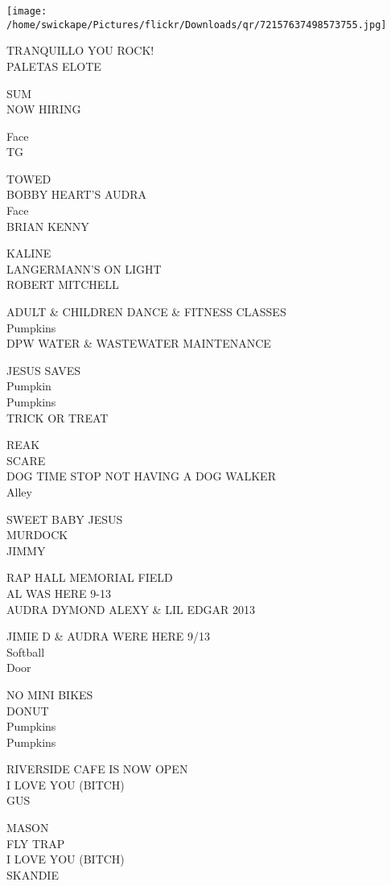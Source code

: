 \documentclass[10pt,letterpaper]{article}
\begin{document}
\texttt{[image: /home/swickape/Pictures/flickr/Downloads/qr/72157637498573755.jpg]}
\pagebreak

TRANQUILLO YOU ROCK!\\
PALETAS ELOTE

SUM\\
NOW HIRING

Face\\
TG

TOWED\\
BOBBY HEART'S AUDRA\\
Face\\
BRIAN KENNY

KALINE\\
LANGERMANN'S ON LIGHT\\
ROBERT MITCHELL

ADULT \& CHILDREN DANCE \& FITNESS CLASSES\\
Pumpkins\\
DPW WATER \& WASTEWATER MAINTENANCE

JESUS SAVES\\
Pumpkin\\
Pumpkins\\
TRICK OR TREAT

REAK\\
SCARE\\
DOG TIME STOP NOT HAVING A DOG WALKER\\
Alley

SWEET BABY JESUS\\
MURDOCK\\
JIMMY

RAP HALL MEMORIAL FIELD\\
AL WAS HERE 9{-}13\\
AUDRA DYMOND ALEXY \& LIL EDGAR 2013

JIMIE D \& AUDRA WERE HERE 9/13\\
Softball\\
Door

NO MINI BIKES\\
DONUT\\
Pumpkins\\
Pumpkins

RIVERSIDE CAFE IS NOW OPEN\\
I LOVE YOU (BITCH)\\
GUS

MASON\\
FLY TRAP\\
I LOVE YOU (BITCH)\\
SKANDIE
\end{document}
